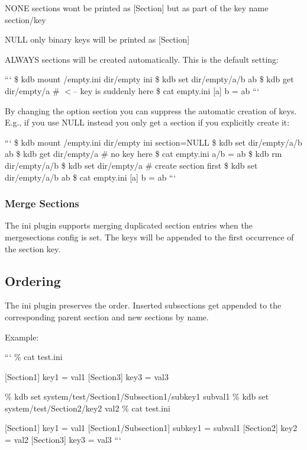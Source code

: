 \begin{DoxyItemize}
\item {\ttfamily N\+O\+N\+E} sections wont be printed as {\ttfamily \mbox{[}Section\mbox{]}} but as part of the key name {\ttfamily section/key}
\item {\ttfamily N\+U\+L\+L} only binary keys will be printed as {\ttfamily \mbox{[}Section\mbox{]}}
\item {\ttfamily A\+L\+W\+A\+Y\+S} sections will be created automatically. This is the default setting\+:
\end{DoxyItemize}

``` \$ kdb mount /empty.ini dir/empty ini \$ kdb set dir/empty/a/b ab \$ kdb get dir/empty/a \# $<$-- key is suddenly here \$ cat empty.\+ini \mbox{[}a\mbox{]} b = ab ```

By changing the option {\ttfamily section} you can suppress the automatic creation of keys. E.\+g., if you use {\ttfamily N\+U\+L\+L} instead you only get a section if you explicitly create it\+:

``` \$ kdb mount /empty.ini dir/empty ini section=N\+U\+L\+L \$ kdb set dir/empty/a/b ab \$ kdb get dir/empty/a \# no key here \$ cat empty.\+ini a/b = ab \$ kdb rm dir/empty/a/b \$ kdb set dir/empty/a \# create section first \$ kdb set dir/empty/a/b ab \$ cat empty.\+ini \mbox{[}a\mbox{]} b = ab ```

\subsubsection*{Merge Sections}

The ini plugin supports merging duplicated section entries when the {\ttfamily mergesections} config is set. The keys will be appended to the first occurrence of the section key.

\subsection*{Ordering}

The ini plugin preserves the order. Inserted subsections get appended to the corresponding parent section and new sections by name.

Example\+:

``` \% cat test.\+ini

\mbox{[}Section1\mbox{]} key1 = val1 \mbox{[}Section3\mbox{]} key3 = val3

\% kdb set system/test/\+Section1/\+Subsection1/subkey1 subval1 \% kdb set system/test/\+Section2/key2 val2 \% cat test.\+ini

\mbox{[}Section1\mbox{]} key1 = val1 \mbox{[}Section1/\+Subsection1\mbox{]} subkey1 = subval1 \mbox{[}Section2\mbox{]} key2 = val2 \mbox{[}Section3\mbox{]} key3 = val3 ``` 